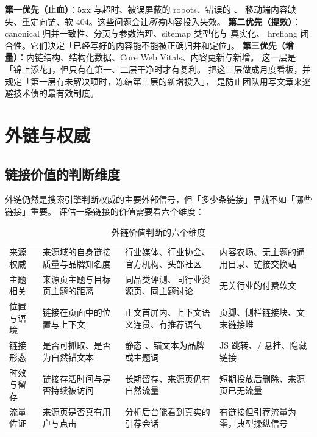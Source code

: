 \begin{keypoint}
\textbf{第一优先（止血）}：5xx 与超时、被误屏蔽的 robots、错误的 、
移动端内容缺失、重定向链、软 404。这些问题会让\emph{所有}内容投入失效。
\textbf{第二优先（提效）}：canonical 归并一致性、分页与参数治理、sitemap 类型化与  真实化、
hreflang 闭合性。它们决定「已经写好的内容能不能被正确归并和定位」。
\textbf{第三优先（增量）}：内链结构、结构化数据、Core Web Vitals、内容更新与新增。
这一层是「锦上添花」，但只有在第一、二层干净时才有复利。
把这三层做成月度看板，并规定「第一层有未解决项时，冻结第三层的新增投入」，
是防止团队用写文章来逃避技术债的最有效制度。
\end{keypoint}

\section{外链与权威}
\label{sec:seo-link}

\subsection{链接价值的判断维度}

外链仍然是搜索引擎判断权威的主要外部信号，但「多少条链接」早就不如「哪些链接」重要。
评估一条链接的价值需要看六个维度：

\begin{table}[htbp]
\centering
\caption{外链价值判断的六个维度}
\label{tab:linkvalue}
\small
\begin{tabularx}{\textwidth}{L{2.1cm} L{3.2cm} L{2.9cm} Y}
\toprule
{} &  &  &  \\
\midrule
来源权威 & 来源域的自身链接质量与品牌知名度 & 行业媒体、行业协会、官方机构、头部社区 & 内容农场、无主题的通用目录、链接交换站 \\
主题相关 & 来源页主题与目标页主题的距离 & 同品类评测、同行业资源页、同主题讨论 & 无关行业的付费软文 \\
位置与语境 & 链接在页面中的位置与上下文 & 正文首屏内、上下文语义连贯、有推荐语气 & 页脚、侧栏链接块、文末链接堆 \\
链接形态 & 是否可抓取、是否为自然锚文本 & 静态 、锚文本为品牌或主题词 & JS 跳转、/ 悬挂、隐藏链接 \\
时效与留存 & 链接存活时间与是否持续被访问 & 长期留存、来源页仍有自然流量 & 短期投放后删除、来源页已无流量 \\
流量佐证 & 来源页是否真有用户与点击 & 分析后台能看到真实的引荐会话 & 有链接但引荐流量为零，典型操纵信号 \\
\bottomrule
\end{tabularx}
\end{table}

